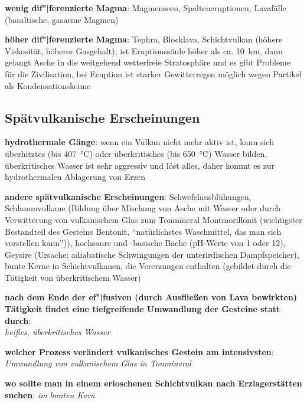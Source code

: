 \textbf{wenig dif"|ferenzierte Magma}:
Magmenseen, Spalteneruptionen, Lavafälle
(basaltische, gasarme Magmen)

\textbf{höher dif"|ferenzierte Magma}:
Tephra, Blocklava, Schichtvulkan
(höhere Viskosität, höherer Gasgehalt),
ist Eruptionssäule höher als ca. \SI{10}{\kilo\meter}, dann gelangt Asche in
die weitgehend wetterfreie Stratosphäre und es gibt Probleme für die Zivilisation,
bei Eruption ist starker Gewitterregen möglich wegen Partikel als Kondensationskeime

\subsection{%
    Spätvulkanische Erscheinungen%
}

\textbf{hydrothermale Gänge}:
wenn ein Vulkan nicht mehr aktiv ist,
kann sich überhitztes (bis \SI{407}{\celsius}) oder überkritisches (bis \SI{650}{\celsius})
Wasser bilden,
überkritisches Wasser ist sehr aggressiv und löst alles,
daher kommt es zur hydrothermalen Ablagerung von Erzen

\textbf{andere spätvulkanische Erscheinungen}:
Schwefelausblühungen,
Schlammvulkane
(Bildung über Mischung von Asche mit Wasser oder
durch Verwitterung von vulkanischem Glas zum Tonmineral Montmorillonit
(wichtigster Bestandteil des Gesteins Bentonit,
"`natürlichstes Waschmittel, das man sich vorstellen kann"')),
hochsaure und -basische Bäche (pH-Werte von 1 oder 12),
Geysire (Ursache: adiabatische Schwingungen der unterirdischen Dampfspeicher),
bunte Kerne in Schichtvulkanen, die Vererzungen enthalten
(gebildet durch die Tätigkeit von überkritischem Wasser)

\begin{wichtig}
    \item
    \textbf{nach dem Ende der ef"|fusiven (durch Ausfließen von Lava bewirkten) Tätigkeit findet
    eine tiefgreifende Umwandlung der Gesteine statt durch}:\\
    \emph{heißes, überkritisches Wasser}
    
    \item
    \textbf{welcher Prozess verändert vulkanisches Gestein am intensivsten}:\\
    \emph{Umwandlung von vulkanischem Glas in Tonmineral}
    
    \item
    \textbf{wo sollte man in einem erloschenen Schichtvulkan nach Erzlagerstätten suchen}:
    \emph{im bunten Kern}
\end{wichtig}

